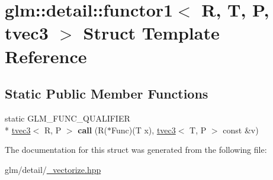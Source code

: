 \hypertarget{structglm_1_1detail_1_1functor1_3_01R_00_01T_00_01P_00_01tvec3_01_4}{\section{glm\-:\-:detail\-:\-:functor1$<$ R, T, P, tvec3 $>$ Struct Template Reference}
\label{structglm_1_1detail_1_1functor1_3_01R_00_01T_00_01P_00_01tvec3_01_4}
}
\subsection*{Static Public Member Functions}
\begin{DoxyCompactItemize}
\item 
\hypertarget{structglm_1_1detail_1_1functor1_3_01R_00_01T_00_01P_00_01tvec3_01_4_a8ae374d9111e3de3d32f18762f1918cc}{static G\-L\-M\-\_\-\-F\-U\-N\-C\-\_\-\-Q\-U\-A\-L\-I\-F\-I\-E\-R \\*
\hyperlink{structglm_1_1tvec3}{tvec3}$<$ R, P $>$ {\bfseries call} (R($\ast$Func)(T x), \hyperlink{structglm_1_1tvec3}{tvec3}$<$ T, P $>$ const \&v)}\label{structglm_1_1detail_1_1functor1_3_01R_00_01T_00_01P_00_01tvec3_01_4_a8ae374d9111e3de3d32f18762f1918cc}

\end{DoxyCompactItemize}


The documentation for this struct was generated from the following file\-:\begin{DoxyCompactItemize}
\item 
glm/detail/\hyperlink{__vectorize_8hpp}{\-\_\-vectorize.\-hpp}\end{DoxyCompactItemize}
